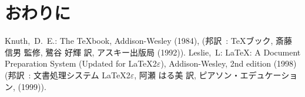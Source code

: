 \section{おわりに}

\begin{thebibliography}{99}
 Knuth,~D.~E.: The \TeX{}book, Addison-Wesley (1984),
  (邦訳~: \TeX{}ブック, 斎藤 信男 監修, 鷺谷 好輝 訳,
  アスキー出版局 (1992)).
Leslie,~L: \LaTeX{}: {A} Document Preparation System (Updated for
  \LaTeX{}2$\varepsilon$), Addison-Wesley, 2nd edition (1998)
  (邦訳~: 文書処理システム \LaTeX{}2$\varepsilon$,
  阿瀬 はる美 訳, ピアソン・エデュケーション, (1999)).
\end{thebibliography}
